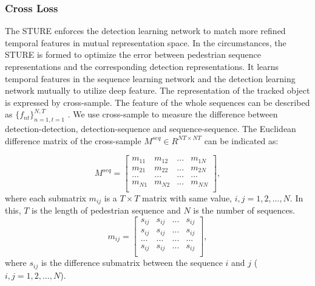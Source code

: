 \documentclass[times,twocolumn,final,authoryear]{elsarticle}
\begin{document}
\vspace{3pt}
\noindent
\subsubsection{Cross Loss}
The STURE enforces the detection learning network to match more refined temporal features in mutual representation space. 
In the circumstances, the STURE is formed to optimize the error between pedestrian sequence representations and the corresponding detection representations.
It learns temporal {features} in the sequence learning network and the detection learning network mutually to utilize deep feature.
The representation of the {tracked} object is expressed by cross-sample.
The feature of the whole sequences can be described as $\{f_{nt}\}_{n=1,t=1}^{N,T}$ .
We use cross-sample to measure the difference between detection-detection, detection-sequence and sequence-sequence.
The Euclidean difference matrix of the cross-sample $M^{seq}\in R^{NT\times NT}$ {can be indicated as:}

\begin{equation}\label{eq:m_seq}
M^{seq}={
	\left[ \begin{array}{cccc}
	m_{11} & m_{12} & ... & m_{1N}\\
	m_{21} & m_{22} & ... & m_{2N}\\
	... & ... & ... & ... \\
	m_{N1} & m_{N2} & ... & m_{NN}\\
	\end{array} 
	\right ]},
\end{equation}
where each submatrix $m_{ij}$ is a $T \times T$ matrix with same value, $i,j=1,2,...,N$. 
In this, $T$ is the length of pedestrian sequence and $N$ is the number of sequences.
\begin{equation}\label{eq:m_ij}
m_{ij}={
	\left[ \begin{array}{cccc}
	s_{ij} & s_{ij} & ... & s_{ij}\\
	s_{ij} & s_{ij} & ... & s_{ij}\\
	... & ... & ... & ... \\
	s_{ij} & s_{ij} & ... & s_{ij}\\
	\end{array} 
	\right ]},
\end{equation}
where $s_{ij}$ is the difference submatrix between the sequence $i$ and $j$ ($i,j=1,2,...,N$).
\end{document}
